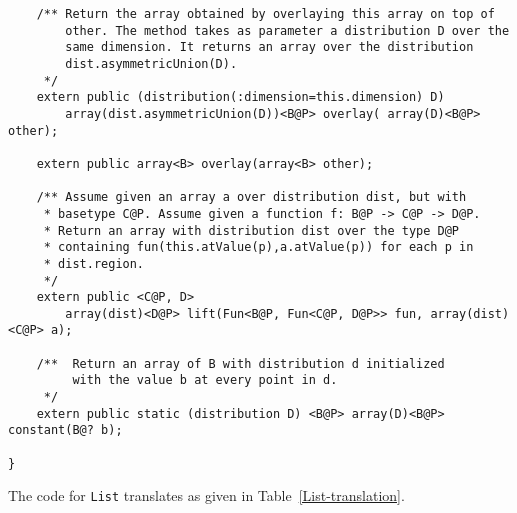 {\begin{verbatim}
    /** Return the array obtained by overlaying this array on top of
        other. The method takes as parameter a distribution D over the
        same dimension. It returns an array over the distribution
        dist.asymmetricUnion(D).
     */
    extern public (distribution(:dimension=this.dimension) D)
        array(dist.asymmetricUnion(D))<B@P> overlay( array(D)<B@P> other);

    extern public array<B> overlay(array<B> other);

    /** Assume given an array a over distribution dist, but with
     * basetype C@P. Assume given a function f: B@P -> C@P -> D@P.
     * Return an array with distribution dist over the type D@P
     * containing fun(this.atValue(p),a.atValue(p)) for each p in
     * dist.region.
     */
    extern public <C@P, D>
        array(dist)<D@P> lift(Fun<B@P, Fun<C@P, D@P>> fun, array(dist)<C@P> a);

    /**  Return an array of B with distribution d initialized
         with the value b at every point in d.
     */
    extern public static (distribution D) <B@P> array(D)<B@P> constant(B@? b);

}
\end{verbatim}}


\begin{example}
 The code for {\tt List} translates as given in Table~\ref{List-translation}.
\end{example}

